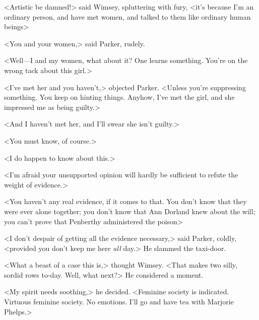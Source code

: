 <Artistic be damned!> said Wimsey, spluttering with fury, <it's because I'm an ordinary person, and have met women, and talked to them like ordinary human beings\longdash>

<You and your women,> said Parker, rudely.

<Well—I and my women, what about it? One learns something. You're on the wrong tack about this girl.>

<I've met her and you haven't,> objected Parker. <Unless you're suppressing something. You keep on hinting things. Anyhow, I've met the girl, and she impressed me as being guilty.>

<And I haven't met her, and I'll swear she isn't guilty.>

<You must know, of course.>

<I do happen to know about this.>

<I'm afraid your unsupported opinion will hardly be sufficient to refute the weight of evidence.>

<You haven't any real evidence, if it comes to that. You don't know that they were ever alone together; you don't know that Ann Dorland knew about the will; you can't prove that Penberthy administered the poison\longdash>

<I don't despair of getting all the evidence necessary,> said Parker, coldly, <provided you don't keep me here \emph{all} day.> He slammed the taxi-door.

<What a beast of a case this is,> thought Wimsey. <That makes two silly, sordid rows to-day. Well, what next?> He considered a moment.

<My spirit needs soothing,> he decided. <Feminine society is indicated. Virtuous feminine society. No emotions. I'll go and have tea with Marjorie Phelps.>